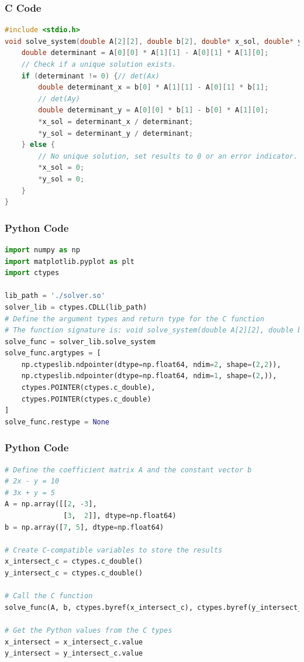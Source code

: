 \documentclass{beamer}
\begin{document}
\begin{frame}[fragile]
  \frametitle{C Code}
  \begin{lstlisting}[language=C]
#include <stdio.h>
void solve_system(double A[2][2], double b[2], double* x_sol, double* y_sol) {  // Solve the 2x2 system using Cramer's rule; det(A)
    double determinant = A[0][0] * A[1][1] - A[0][1] * A[1][0];
    // Check if a unique solution exists.
    if (determinant != 0) {// det(Ax)
        double determinant_x = b[0] * A[1][1] - A[0][1] * b[1];
        // det(Ay)
        double determinant_y = A[0][0] * b[1] - b[0] * A[1][0];
        *x_sol = determinant_x / determinant;
        *y_sol = determinant_y / determinant;
    } else {
        // No unique solution, set results to 0 or an error indicator.
        *x_sol = 0;
        *y_sol = 0;
    }
}
  \end{lstlisting}
\end{frame}

\begin{frame}[fragile]
  \frametitle{Python Code}
  \begin{lstlisting}[language=Python]
import numpy as np
import matplotlib.pyplot as plt
import ctypes

lib_path = './solver.so'
solver_lib = ctypes.CDLL(lib_path)
# Define the argument types and return type for the C function
# The function signature is: void solve_system(double A[2][2], double b[2], double* x, double* y)
solve_func = solver_lib.solve_system
solve_func.argtypes = [
    np.ctypeslib.ndpointer(dtype=np.float64, ndim=2, shape=(2,2)),
    np.ctypeslib.ndpointer(dtype=np.float64, ndim=1, shape=(2,)),
    ctypes.POINTER(ctypes.c_double),
    ctypes.POINTER(ctypes.c_double)
]
solve_func.restype = None
  \end{lstlisting}
\end{frame}

\begin{frame}[fragile]
  \frametitle{Python Code}
  \begin{lstlisting}[language=Python]
# Define the coefficient matrix A and the constant vector b
# 2x - y = 10
# 3x + y = 5
A = np.array([[2, -3],
              [3,  2]], dtype=np.float64)
b = np.array([7, 5], dtype=np.float64)

# Create C-compatible variables to store the results
x_intersect_c = ctypes.c_double()
y_intersect_c = ctypes.c_double()

# Call the C function
solve_func(A, b, ctypes.byref(x_intersect_c), ctypes.byref(y_intersect_c))

# Get the Python values from the C types
x_intersect = x_intersect_c.value
y_intersect = y_intersect_c.value
   \end{lstlisting}
\end{frame}
\end{document}
